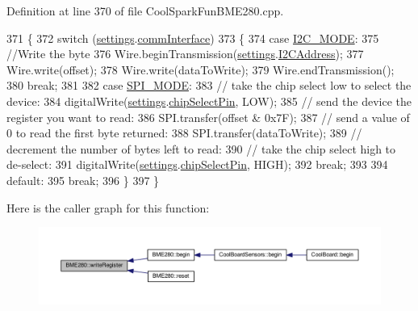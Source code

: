 Definition at line 370 of file Cool\+Spark\+Fun\+B\+M\+E280.\+cpp.


\begin{DoxyCode}
371 \{
372     \textcolor{keywordflow}{switch} (\hyperlink{class_b_m_e280_af06253eb2f8ad4b5fabb858bc4a973bf}{settings}.\hyperlink{struct_sensor_settings_a5bf116387c543a6ea5732976424e8cb1}{commInterface})
373     \{
374     \textcolor{keywordflow}{case} \hyperlink{_cool_spark_fun_b_m_e280_8h_a5cd01756030509b764d43a2b8c94fce8}{I2C\_MODE}:
375         \textcolor{comment}{//Write the byte}
376         Wire.beginTransmission(\hyperlink{class_b_m_e280_af06253eb2f8ad4b5fabb858bc4a973bf}{settings}.\hyperlink{struct_sensor_settings_af8103021dbce7e5ee6d786c4893324f7}{I2CAddress});
377         Wire.write(offset);
378         Wire.write(dataToWrite);
379         Wire.endTransmission();
380         \textcolor{keywordflow}{break};
381 
382     \textcolor{keywordflow}{case} \hyperlink{_cool_spark_fun_b_m_e280_8h_ab1dcc9464e3fcb94922386e8a7f53f21}{SPI\_MODE}:
383         \textcolor{comment}{// take the chip select low to select the device:}
384         digitalWrite(\hyperlink{class_b_m_e280_af06253eb2f8ad4b5fabb858bc4a973bf}{settings}.\hyperlink{struct_sensor_settings_abe2de606ebb580ad81e3fafb1a454580}{chipSelectPin}, LOW);
385         \textcolor{comment}{// send the device the register you want to read:}
386         SPI.transfer(offset & 0x7F);
387         \textcolor{comment}{// send a value of 0 to read the first byte returned:}
388         SPI.transfer(dataToWrite);
389         \textcolor{comment}{// decrement the number of bytes left to read:}
390         \textcolor{comment}{// take the chip select high to de-select:}
391         digitalWrite(\hyperlink{class_b_m_e280_af06253eb2f8ad4b5fabb858bc4a973bf}{settings}.\hyperlink{struct_sensor_settings_abe2de606ebb580ad81e3fafb1a454580}{chipSelectPin}, HIGH);
392         \textcolor{keywordflow}{break};
393 
394     \textcolor{keywordflow}{default}:
395         \textcolor{keywordflow}{break};
396     \}
397 \}
\end{DoxyCode}
Here is the caller graph for this function\+:\nopagebreak
\begin{figure}[H]
\begin{center}
\leavevmode
\includegraphics[width=350pt]{df/dcf/class_b_m_e280_afcff21c342725246bf415d7f0e4d04f0_icgraph}
\end{center}
\end{figure}


